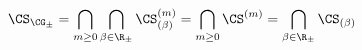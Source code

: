 \begin{equation}
\CS_{\CG_\pm} = \bigcap_{m\ge 0} \bigcap_{\beta \in\R_\pm} 
		 \CS^{(m)}_{(\beta )}
	=\bigcap_{m\ge 0} \CS^{(m)} = \bigcap_{\beta\in\R_\pm}\CS_{(\beta )}
\label{eq:Sb}
\end{equation}

